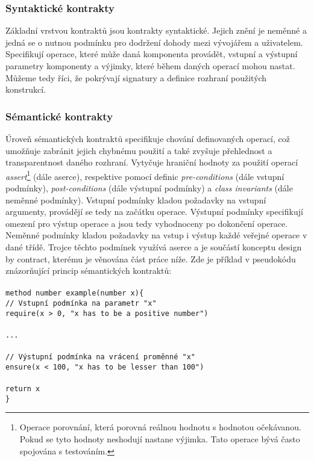 		\subsubsection{Syntaktické kontrakty}
			Základní vrstvou kontraktů jsou kontrakty syntaktické. Jejich znění je neměnné a jedná se o nutnou podmínku pro dodržení dohody mezi vývojářem a uživatelem. Specifikují operace, které může daná komponenta provádět, vstupní a výstupní parametry komponenty a výjimky, které během daných operací mohou nastat. Můžeme tedy říci, že pokrývají signatury a definice rozhraní použitých konstrukcí. 
		
		\subsubsection{Sémantické kontrakty}
			Úroveň sémantických kontraktů specifikuje chování definovaných operací, což umožňuje zabránit jejich chybnému použití a také zvyšuje přehlednost a transparentnost daného rozhraní. Vytyčuje hraniční hodnoty za použití operací \emph{assert}\footnote{Operace porovnání, která porovná reálnou hodnotu s hodnotou očekávanou. Pokud se tyto hodnoty neshodují nastane výjimka. Tato operace bývá často spojována s testováním.} (dále aserce), respektive pomocí definic \emph{pre-conditions} (dále vstupní podmínky), \emph{post-conditions} (dále výstupní podmínky) a \emph{class invariants} (dále neměnné podmínky). Vstupní podmínky kladou požadavky na vstupní argumenty, provádějí se tedy na začátku operace. Výstupní podmínky specifikují omezení pro výstup operace a jsou tedy vyhodnoceny po dokončení operace. Neměnné podmínky kladou požadavky na vstup i výstup každé veřejné operace v dané třídě. Trojce těchto podmínek využívá aserce a je součástí konceptu design by contract, kterému je věnována část práce níže. Zde je příklad v pseudokódu znázorňující princip sémantických kontraktů:\\\\
			\- \- \- \- \- \texttt{method number example(number x)\{}\\
			\- \- \- \- \- \- \- \- \- \- \texttt{// Vstupní podmínka na parametr "x"}\\ 
        	\- \- \- \- \- \- \- \- \- \- \texttt{require(x > 0, "x has to be a positive number")}\\\\
        	\- \- \- \- \- \- \- \- \- \- \texttt{...}\\\\ 
        	\- \- \- \- \- \- \- \- \- \- \texttt{// Výstupní podmínka na vrácení proměnné "x"}\\ 
        	\- \- \- \- \- \- \- \- \- \- \texttt{ensure(x < 100, "x has to be lesser than 100")}\\\\
			\- \- \- \- \- \- \- \- \- \- \texttt{return x}\\ 
    		\- \- \- \- \- \texttt{\}}\\
    		
